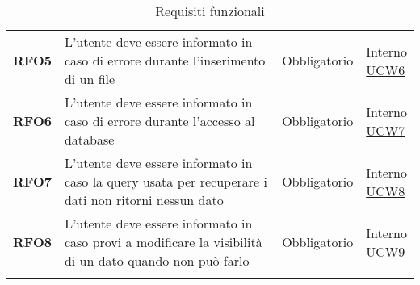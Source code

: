 \begin{longtable}[H]{| >{\raggedright\bfseries}m{20mm} | >{\raggedright}m{90mm} | >{\centering}m{25mm} | >{\centering\arraybackslash}m{30mm}|}
    RFO5
     & L'utente deve essere informato in caso di errore durante l'inserimento di un file
     & Obbligatorio
     & \makecell{ Interno                                                                                                \\  \hyperref[sub:ucw6]{UCW6} }\\

    RFO6
     & L'utente deve essere informato in caso di errore durante l'accesso al database
     & Obbligatorio
     & \makecell{ Interno                                                                                                \\  \hyperref[sub:ucw7]{UCW7} }\\

    RFO7
     & L'utente deve essere informato in caso la query usata per recuperare i dati non ritorni nessun dato
     & Obbligatorio
     & \makecell{ Interno                                                                                                \\  \hyperref[sub:ucw8]{UCW8} }\\

    RFO8
     & L'utente deve essere informato in caso provi a modificare la visibilità di un dato quando non può farlo
     & Obbligatorio
     & \makecell{ Interno                                                                                                \\  \hyperref[sub:ucw9]{UCW9} }\\
    \hline
    \rowcolor{white}
    \caption{Requisiti funzionali}%
    \label{tab:requisiti_funzionali}
\end{longtable}

